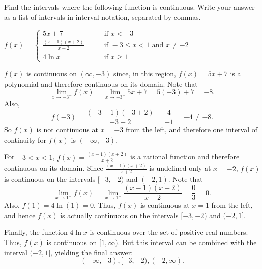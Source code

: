 \documentclass[nooutcomes]{ximera}
\begin{document}
\begin{problem}
Find the intervals where the following function is continuous.  Write your answer as a list of intervals in interval notation, separated by commas.
	
	$f(x) =   \left\{ \begin{array}{cl}
	5x + 7		 	&	\qquad \text{if } x < -3					\\
	\frac{(x-1)(x+2)}{x+2}	&	\qquad \text{if } -3 \leq x < 1 \text{ and } x \neq -2	\\
	4 \ln x				&	\qquad \text{if } x \geq 1					\end{array} \right.  $
	
	\begin{freeResponse}
	
	$f(x)$ is continuous on $(\infty, -3)$ since, in this region, $f(x)=5x+7$ is a polynomial and therefore continuous on its domain.  Note that 
	$$\lim_{x \to -3^-} f(x) = \lim_{x \to -3^-} 5x+7 = 5(-3) + 7 = -8.$$
	  Also, 
	  $$f(-3) = \frac{(-3-1)(-3+2)}{-3+2} = \frac{4}{-1} = -4 \neq -8.$$
	   So $f(x)$ is not continuous at $x=-3$ from the left, and therefore one interval of continuity for $f(x)$ is $(-\infty, -3)$.  
	
	For $-3 < x < 1$, $f(x) = \frac{(x-1)(x+2)}{x+2}$ is a rational function and therefore continuous on its domain.  Since $\frac{(x-1)(x+2)}{x+2}$ is undefined only at $x=-2$, $f(x)$ is continuous on the intervals $[-3,-2)$ and $(-2, 1)$.  Note that 
	$$\lim_{x \to 1^-} f(x) = \lim_{x \to 1^-} \frac{(x-1)(x+2)}{x+2} = \frac{0}{3} = 0.$$
	Also, $f(1) = 4 \ln (1) = 0$.  Thus, $f(x)$ is continuous at $x=1$ from the left, and hence $f(x)$ is actually continuous on the intervals $[-3,-2)$ and $(-2, 1]$.
	
	Finally, the function $4 \ln x$ is continuous over the set of positive real numbers.  Thus, $f(x)$ is continuous on $[1, \infty)$.  But this interval can be combined with the interval $(-2, 1]$, yielding the final answer:
	$$(-\infty, -3), [-3, -2), (-2, \infty).$$
	
	\end{freeResponse}
	
	
			
	
\end{problem}
	
	
	
	
			
			
\end{document}
